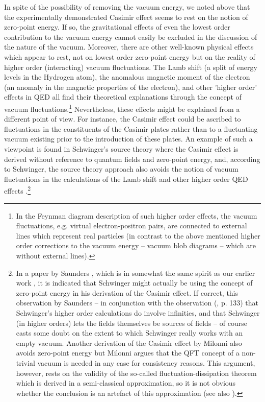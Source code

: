 \documentclass[12pt]{article}
\begin{document}
In spite of the possibility of removing the vacuum energy, we
noted above that the experimentally demonstrated Casimir effect
seems to rest on the notion of zero-point energy. If so, the
gravitational effects of even the lowest order contribution to the
vacuum energy cannot easily be excluded in the discussion of the
nature of the vacuum. Moreover, there are other well-known
physical effects which appear to rest, not on lowest order
zero-point energy but on the reality of higher order (interacting)
vacuum fluctuations. The Lamb shift (a split of energy levels in
the Hydrogen atom), the anomalous magnetic moment of the electron
(an anomaly in the magnetic properties of the electron), and other
'higher order' effects in QED all find their theoretical
explanations through the concept of vacuum
fluctuations.\footnote{In the Feynman diagram description of
such higher order effects, the vacuum fluctuations, e.g. virtual
electron-positron pairs, are connected to external lines which
represent real particles (in contrast to the above mentioned
higher order corrections to the vacuum energy -- vacuum blob
diagrams -- which are without external lines).} Nevertheless,
these effects might be explained from a different point of view.
For instance, the Casimir effect could be ascribed to fluctuations
in the constituents of the Casimir plates rather than to a
fluctuating vacuum existing prior to the introduction of these
plates. An example of such a viewpoint is found in Schwinger's
source theory where the Casimir effect is derived without
reference to quantum fields and zero-point energy, and, according
to Schwinger, the source theory approach also avoids the notion of
vacuum fluctuations in the calculations of the Lamb shift and
other higher order QED effects \cite{rugh98}.\footnote{In a paper
by Saunders \cite{saunders99}, which is in somewhat the same
spirit as our earlier work \cite{rugh96,rugh98}, it is indicated
that Schwinger might actually be using the concept of zero-point
energy in his derivation of the Casimir effect. If correct, this
observation by Saunders -- in conjunction with the observation
(\cite{rugh98}, p. 133) that Schwinger's higher order calculations
do involve infinities, and that Schwinger (in higher orders) lets
the fields themselves be sources of fields -- of course casts some
doubt on the extent to which Schwinger really works with an empty
vacuum. Another derivation of the Casimir effect by Milonni
\cite{milonni94} also avoids zero-point energy but Milonni argues
that the QFT concept of a non-trivial vacuum is needed in any case
for consistency reasons. This argument, however, rests on the
validity of the so-called fluctuation-dissipation theorem which is
derived in a semi-classical approximation, so it is not obvious
whether the conclusion is an artefact of this approximation (see
also \cite{saunders99}).}
\end{document}
